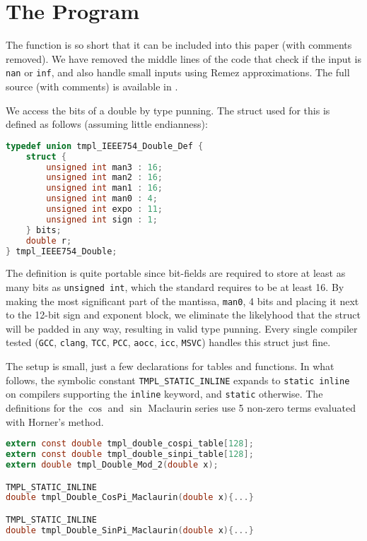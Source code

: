 \documentclass{article}
\theoremstyle{plain}
\begin{document}
    \section{The Program}
        The function is so short that it can be included into this paper
        (with comments removed). We have removed the middle lines of the
        code that check if the input is \texttt{nan} or \texttt{inf},
        and also handle small inputs using Remez approximations.
        The full source (with comments) is available in \cite{MaguireLibtmpl}.
        \par\hfill\par
        We access the bits of a double by type punning. The struct used for
        this is defined as follows (assuming little endianness):
        \begin{mdframed}
            \begin{lstlisting}[language={C}]
typedef union tmpl_IEEE754_Double_Def {
    struct {
        unsigned int man3 : 16;
        unsigned int man2 : 16;
        unsigned int man1 : 16;
        unsigned int man0 : 4;
        unsigned int expo : 11;
        unsigned int sign : 1;
    } bits;
    double r;
} tmpl_IEEE754_Double;
            \end{lstlisting}
        \end{mdframed}
        The definition is quite portable since bit-fields are required to
        store at least as many bits as \texttt{unsigned int}, which the
        standard requires to be at least 16. By making the most significant
        part of the mantissa, \texttt{man0}, 4 bits and placing it next to the
        12-bit sign and exponent block, we eliminate the likelyhood that
        the struct will be padded in any way, resulting in valid type punning.
        Every single compiler tested (\texttt{GCC}, \texttt{clang},
        \texttt{TCC}, \texttt{PCC}, \texttt{aocc}, \texttt{icc}, \texttt{MSVC})
        handles this struct just fine.
        \par\hfill\par
        The setup is small, just a few declarations for tables and functions.
        In what follows, the symbolic constant \texttt{TMPL\_STATIC\_INLINE}
        expands to \texttt{static inline} on compilers supporting the
        \texttt{inline} keyword, and \texttt{static} otherwise. The
        definitions for the $\cos$ and $\sin$ Maclaurin series use
        5 non-zero terms evaluated with Horner's method.
        \begin{mdframed}
            \begin{lstlisting}[language={C}]
extern const double tmpl_double_cospi_table[128];
extern const double tmpl_double_sinpi_table[128];
extern double tmpl_Double_Mod_2(double x);

TMPL_STATIC_INLINE
double tmpl_Double_CosPi_Maclaurin(double x){...}

TMPL_STATIC_INLINE
double tmpl_Double_SinPi_Maclaurin(double x){...}
            \end{lstlisting}
        \end{mdframed}
\end{document}
